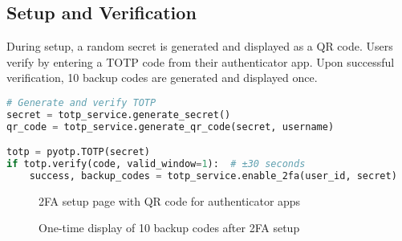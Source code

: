\documentclass[12pt,a4paper]{article}
\begin{document}
\subsection{Setup and Verification}

During setup, a random secret is generated and displayed as a QR code. Users verify by entering a TOTP code from their authenticator app. Upon successful verification, 10 backup codes are generated and displayed once.

\begin{lstlisting}[language=Python]
# Generate and verify TOTP
secret = totp_service.generate_secret()
qr_code = totp_service.generate_qr_code(secret, username)

totp = pyotp.TOTP(secret)
if totp.verify(code, valid_window=1):  # ±30 seconds
    success, backup_codes = totp_service.enable_2fa(user_id, secret)
\end{lstlisting}

\begin{figure}[H]
    \centering
    \caption{2FA setup page with QR code for authenticator apps}
    \label{fig:2fa_setup}
\end{figure}

\begin{figure}[H]
    \centering
    \caption{One-time display of 10 backup codes after 2FA setup}
    \label{fig:backup}
\end{figure}
\end{document}
